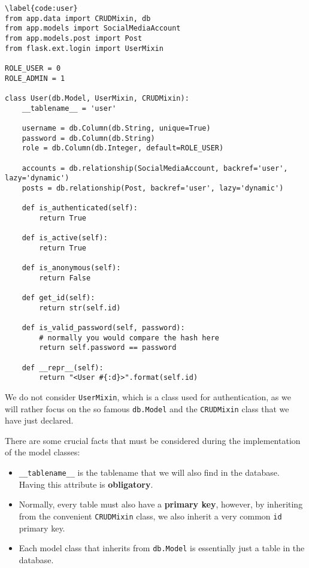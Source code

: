 \documentclass[../main/main.tex]{subfiles}
\begin{document}
\begin{lstlisting}
\label{code:user}
from app.data import CRUDMixin, db
from app.models import SocialMediaAccount
from app.models.post import Post
from flask.ext.login import UserMixin

ROLE_USER = 0
ROLE_ADMIN = 1

class User(db.Model, UserMixin, CRUDMixin):
    __tablename__ = 'user'

    username = db.Column(db.String, unique=True)
    password = db.Column(db.String)
    role = db.Column(db.Integer, default=ROLE_USER)

    accounts = db.relationship(SocialMediaAccount, backref='user', lazy='dynamic')
    posts = db.relationship(Post, backref='user', lazy='dynamic')

    def is_authenticated(self):
        return True

    def is_active(self):
        return True

    def is_anonymous(self):
        return False

    def get_id(self):
        return str(self.id)

    def is_valid_password(self, password):
        # normally you would compare the hash here
        return self.password == password

    def __repr__(self):
        return "<User #{:d}>".format(self.id)
\end{lstlisting}

We do not consider \lstinline|UserMixin|, which is a class used for
authentication, as we will rather focus on the so famous
\lstinline|db.Model| and the \lstinline|CRUDMixin| class that we have
just declared.

There are some crucial facts that must be considered during the
implementation of the model classes:

\begin{itemize}
  \item \lstinline|__tablename__| is the tablename that we will also
    find in the database. Having this attribute is
    \textbf{obligatory}. 
  \item Normally, every table must also have a \textbf{primary key}, however,
    by inheriting from the convenient \lstinline|CRUDMixin| class, we
    also inherit a very common \lstinline|id| primary key. 
  \item Each model class that inherits from \lstinline|db.Model|
    is essentially just a table in the database. 
\end{itemize}
\end{document}
